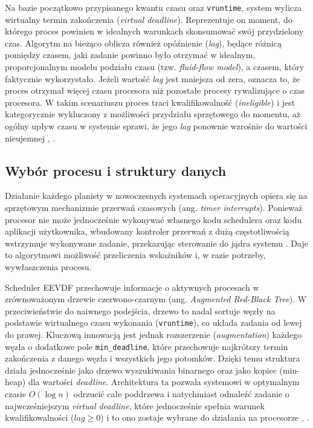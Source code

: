 Na bazie początkowo przypisanego kwantu czasu oraz \texttt{vruntime}, system wylicza wirtualny termin zakończenia (\textit{virtual deadline}). Reprezentuje on moment, do którego proces powinien w idealnych warunkach skonsumować swój przydzielony czas. Algorytm na bieżąco oblicza również opóźnienie (\textit{lag}), będące różnicą pomiędzy czasem, jaki zadanie powinno było otrzymać w idealnym, proporcjonalnym modelu podziału czasu (tzw. \textit{fluid-flow model}), a czasem, który faktycznie wykorzystało. Jeżeli wartość \textit{lag} jest mniejsza od zera, oznacza to, że proces otrzymał więcej czasu procesora niż pozostałe procesy rywalizujące o czas procesora. W takim scenariuszu proces traci kwalifikowalność (\textit{ineligible}) i jest kategorycznie wykluczony z możliwości przydziału sprzętowego do momentu, aż ogólny upływ czasu w systemie sprawi, że jego \textit{lag} ponownie wzrośnie do wartości nieujemnej \cite{1}, \cite{15}.

\subsection{Wybór procesu i struktury danych}
Działanie każdego planisty w nowoczesnych systemach operacyjnych opiera się na sprzętowym mechanizmie przerwań czasowych (ang. \textit{timer interrupts}). Ponieważ procesor nie może jednocześnie wykonywać własnego kodu schedulera oraz kodu aplikacji użytkownika, wbudowany kontroler przerwań z dużą częstotliwością wstrzymuje wykonywane zadanie, przekazując sterowanie do jądra systemu \cite{13}. Daje to algorytmowi możliwość przeliczenia wskaźników i, w razie potrzeby, wywłaszczenia procesu.

Scheduler EEVDF przechowuje informacje o aktywnych procesach w zrównoważonym drzewie czerwono-czarnym (ang. \textit{Augmented Red-Black Tree}). W przeciwieństwie do naiwnego podejścia, drzewo to nadal sortuje węzły na podstawie wirtualnego czasu wykonania (\texttt{vruntime}), co układa zadania od lewej do prawej. Kluczową innowacją jest jednak rozszerzenie (\textit{augmentation}) każdego węzła o dodatkowe pole \texttt{min\_deadline}, które przechowuje najkrótszy termin zakończenia z danego węzła i wszystkich jego potomków. Dzięki temu struktura działa jednocześnie jako drzewo wyszukiwania binarnego oraz jako kopiec (min-heap) dla wartości \textit{deadline}. Architektura ta pozwala systemowi w optymalnym czasie $O(\log n)$ odrzucić całe poddrzewa i natychmiast odnaleźć zadanie o najwcześniejszym \textit{virtual deadline}, które jednocześnie spełnia warunek kwalifikowalności ($lag \ge 0$) i to ono zostaje wybrane do działania na procesorze \cite{4}, \cite{19}.

